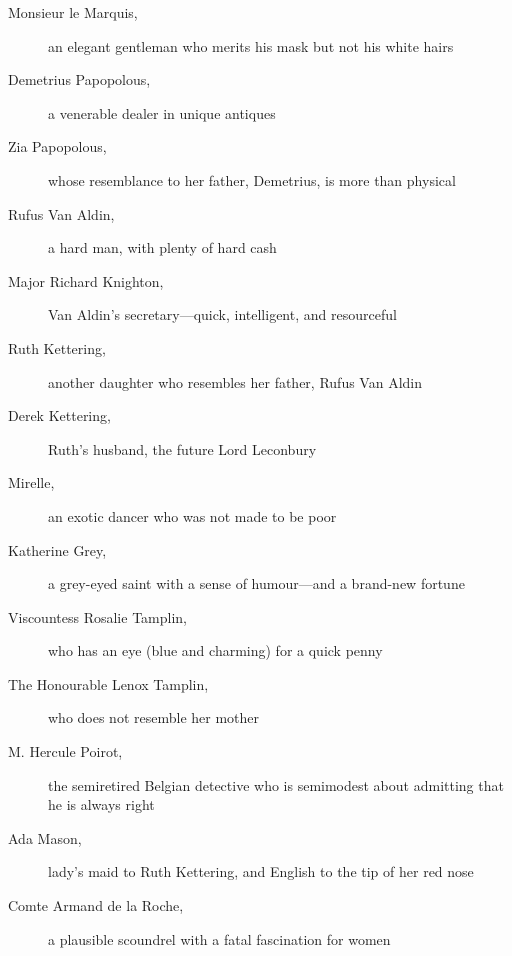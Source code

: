 
\begin{a4}
	\enlargethispage{\baselineskip}
\end{a4}

\begin{description}
\item[Monsieur le Marquis,] an elegant gentleman who merits his mask but not his white hairs

\item[Demetrius Papopolous,] a venerable dealer in unique antiques

\item[Zia Papopolous,] whose resemblance to her father, Demetrius, is more than physical

\item[Rufus Van Aldin,] a hard man, with plenty of hard cash

\item[Major Richard Knighton,] Van Aldin's secretary—quick, intelligent, and resourceful

\item[Ruth Kettering,] another daughter who resembles her father, Rufus Van Aldin

\item[Derek Kettering,] Ruth's husband, the future Lord Leconbury

\item[Mirelle,] an exotic dancer who was not made to be poor

\item[Katherine Grey,] a grey-eyed saint with a sense of humour—and a brand-new fortune

\item[Viscountess Rosalie Tamplin,] who has an eye (blue and charming) for a quick penny

\item[The Honourable Lenox Tamplin,] who does not resemble her mother

\item[M. Hercule Poirot,] the semiretired Belgian detective who is semimodest about admitting that he is always right

\item[Ada Mason,] lady's maid to Ruth Kettering, and English to the tip of her red nose

\item[Comte Armand de la Roche,] a plausible scoundrel with a fatal fascination for women
\end{description}